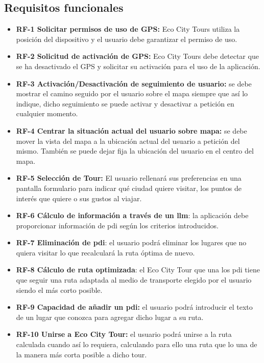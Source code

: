 \subsection{Requisitos funcionales}
\begin{itemize}
	\item \textbf{RF-1 Solicitar permisos de uso de GPS:} Eco City Tours utiliza la posición del dispositivo y el usuario debe garantizar el permiso de uso.
	\item \textbf{RF-2 Solicitud de activación de GPS:} Eco City Tours debe detectar que se ha desactivado el GPS y solicitar su activación para el uso de la aplicación.
	\item \textbf{RF-3 Activación/Desactivación de seguimiento de usuario:} se debe mostrar el camino seguido por el usuario sobre el mapa siempre que así lo indique, dicho seguimiento se puede activar y desactivar a petición en cualquier momento.
	\item \textbf{RF-4 Centrar la situación actual del usuario sobre mapa:} se debe mover la vista del mapa a la ubicación actual del usuario a petición del mismo. También se puede dejar fija la ubicación del usuario en el centro del mapa.
	\item \textbf{RF-5 Selección de Tour:} El usuario rellenará sus preferencias en una pantalla formulario para indicar qué ciudad quiere visitar, los puntos de interés que quiere o sus gustos al viajar.
	\item \textbf{RF-6 Cálculo de información a través de un \acrfull{llm}}: la aplicación debe proporcionar información de \acrfull{pdi} según los criterios introducidos.
	\item \textbf{RF-7 Eliminación de \acrshort{pdi}}: el usuario podrá eliminar los lugares que no quiera visitar lo que recalculará la ruta óptima de nuevo.
	\item \textbf{RF-8 Cálculo de ruta optimizada}: el Eco City Tour que una los \acrshort{pdi} tiene que seguir una ruta adaptada al medio de transporte elegido por el usuario siendo el más corto posible.
	\item \textbf{RF-9 Capacidad de añadir un \acrshort{pdi}:} el usuario podrá introducir el texto de un lugar que conozca para agregar dicho lugar a su ruta.
	\item \textbf{RF-10 Unirse a Eco City Tour:} el usuario podrá unirse a la ruta calculada cuando así lo requiera, calculando para ello una ruta que lo una de la manera más corta posible a dicho tour.
	
	
\end{itemize}
